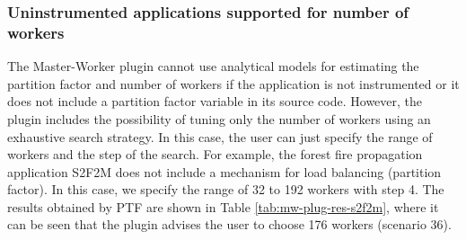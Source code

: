 \begin {comment}
Summarizing, if the tuning process with PTF advises a number of workers which is significantly larger than the one used to estimate the partition factor (the one indicated by the user in the execution command) then repeating the experiment using the advised number of workers will likely produce a better combination of the tuning parameters.

\begin{figure}[bt]
  \center
  \texttt{[image: ../BPG/images/MWfeatures-model-206.png]}
	\caption{Real application execution time for partition factor values 1.0, 0.65 and 0.54.}
	\label{fig:MWprimes-exhaustive-206}
\end{figure}
\end{comment}


\subsubsection{Uninstrumented applications supported for number of workers}\label{para:mw-unints}

The Master-Worker plugin cannot use analytical models for estimating the partition factor and number of workers if the application is not instrumented or it does not include a partition factor variable in its source code.  However, the plugin includes the possibility of tuning only the number of workers using an exhaustive search strategy. In this case, the user can just specify the range of workers and the step of the search. For example, the forest fire propagation application S2F2M \cite{Mostaccio05}  does not include a mechanism for load balancing (partition factor). In this case, we specify the range of 32 to 192 workers with step 4. The results obtained by PTF are shown in Table \ref{tab:mw-plug-res-s2f2m}, where it can be seen that the plugin advises the user to choose 176 workers (scenario 36).

